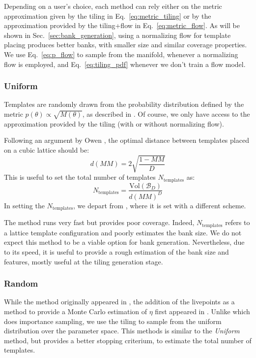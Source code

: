 \documentclass[twocolumn,showpacs,preprintnumbers,nofootinbib,prd,
superscriptaddress,10pt]{revtex4-2}
\begin{document}
Depending on a user's choice, each method can rely either on the metric approximation given by the tiling in Eq.~\eqref{eq:metric_tiling} or by the approximation provided by the tiling+flow in Eq.~\eqref{eq:metric_flow}.
As will be shown in Sec.~\ref{sec:bank_generation}, using a normalizing flow for template placing produces better banks, with smaller size and similar coverage properties.
We use Eq.~\eqref{eq:p_flow} to sample from the manifold, whenever a normalizing flow is employed, and Eq.~\eqref{eq:tiling_pdf} whenever we don't train a flow model.

\subsubsection{Uniform}\label{par:uniform}
Templates are randomly drawn from the probability distribution defined by the metric $p(\theta) \propto \sqrt{M(\theta)}$, as described in \cite{Messenger:2008ta}.
Of course, we only have access to the approximation provided by the tiling (with or without normalizing flow).

Following an argument by Owen \cite{owen_metric}, the optimal distance between templates placed on a cubic lattice should be:
\begin{equation}
	d(MM) = 2 \sqrt{\frac{1-MM}{D}}
\end{equation}
This is useful to set the total number of templates $N_\mathrm{templates}$ as:
\begin{equation} \label{eq:N_templates}
	N_{\text{templates}} = \frac{\text{Vol}(\mathcal{B}_D)}{d(MM)^D}
\end{equation}
In setting the $N_{\text{templates}}$, we depart from \cite{Messenger:2008ta}, where it is set with a different scheme.

The method runs very fast but provides poor coverage. Indeed, $N_{\text{templates}}$ refers to a lattice template configuration and poorly estimates the bank size. We do not expect this method to be a viable option for bank generation.
Nevertheless, due to its speed, it is useful to provide a rough estimation of the bank size and features, mostly useful at the tiling generation stage.

\subsubsection{Random}\label{par:random}
While the method originally appeared in \cite{Messenger:2008ta}, the addition of the livepoints as a method to provide a Monte Carlo estimation of $\eta$ first appeared in \cite{Coogan:2022qxs}. Unlike \cite{Coogan:2022qxs} which does importance sampling, we use the tiling to sample from the uniform distribution over the parameter space.
This methods is similar to the {\it Uniform} method, but provides a better stopping criterium, to estimate the total number of templates.
\end{document}
